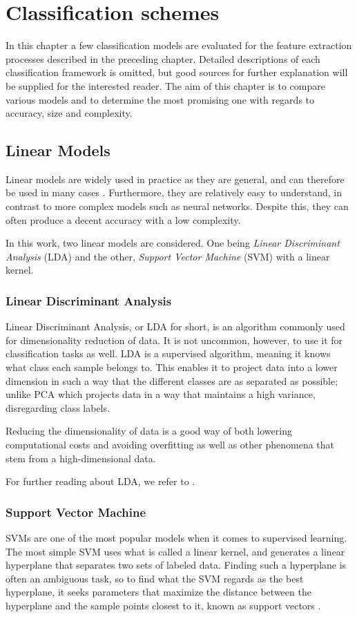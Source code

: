 \chapter{Classification schemes}
In this chapter a few classification models are evaluated for the feature extraction processes described in the preceding chapter. Detailed descriptions of each classification framework is omitted, but good sources for further explanation will be supplied for the interested reader. The aim of this chapter is to compare various models and to determine the most promising one with regards to accuracy, size and complexity. 

\section{Linear Models}
Linear models are widely used in practice as they are general, and can therefore be used in many cases \citep{shalev-shwartz_ben-david_2016}.  Furthermore, they are relatively easy to understand, in contrast to more complex models such as neural networks. Despite this, they can often produce a decent accuracy with a low complexity.

In this work, two linear models are considered. One being \emph{Linear Discriminant Analysis} (LDA) and the other, \emph{Support Vector Machine} (SVM) with a linear kernel. 

\subsection*{Linear Discriminant Analysis}
Linear Discriminant Analysis, or LDA for short, is an algorithm commonly used for dimensionality reduction of data. \citep{raschka_2014} It is not uncommon, however, to use it for classification tasks as well. LDA is a supervised algorithm, meaning it knows what class each sample belongs to. This enables it to project data into a lower dimension in such a way that the different classes are as separated as possible; unlike PCA which projects data in a way that maintains a high variance, disregarding class labels. 

Reducing the dimensionality of data is a good way of both lowering computational costs and avoiding overfitting as well as other phenomena that stem from a high-dimensional data.

For further reading about LDA, we refer to \citep{raschka_2014}.

\subsection*{Support Vector Machine}
SVMs are one of the most popular models when it comes to supervised learning. The most simple SVM uses what is called a linear kernel, and generates a linear hyperplane that separates two sets of labeled data. Finding such a hyperplane is often an ambiguous task, so to find what the SVM regards as the best hyperplane, it seeks parameters that maximize the distance between the hyperplane and the sample points closest to it, known as support vectors \citep{boswell2002introduction}.

